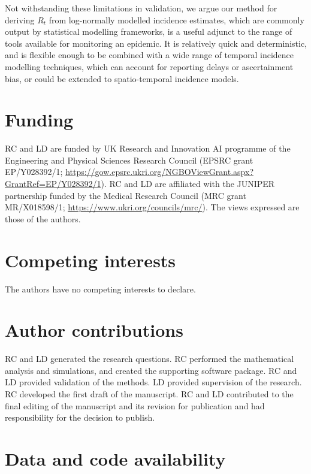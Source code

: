 \documentclass[10pt,letterpaper]{article}
\begin{document}
Not withstanding these limitations in validation, we argue our method for deriving $R_t$ from log-normally modelled incidence estimates, which are commonly output by statistical modelling frameworks, is a useful adjunct to the range of tools available for monitoring an epidemic. It is relatively quick and deterministic, and is flexible enough to be combined with a wide range of temporal incidence modelling techniques, which can account for reporting delays or ascertainment bias, or could be extended to spatio-temporal incidence models.

\nolinenumbers



\section*{Funding}

RC and LD are funded by UK Research and Innovation AI programme of the Engineering and Physical Sciences Research Council (EPSRC grant EP/Y028392/1;  \url{https://gow.epsrc.ukri.org/NGBOViewGrant.aspx?GrantRef=EP/Y028392/1}). RC and LD are affiliated with the JUNIPER partnership funded by the Medical Research Council (MRC grant MR/X018598/1; \url{https://www.ukri.org/councils/mrc/}). The views expressed are those of the authors.

\section*{Competing interests}

The authors have no competing interests to declare.

\section*{Author contributions}

RC and LD generated the research questions. RC performed the mathematical analysis and simulations, and created the supporting software package. RC and LD provided validation of the methods. LD provided supervision of the research. RC developed the first draft of the manuscript. RC and LD contributed to the final editing of the manuscript and its revision for publication and had responsibility for the decision to publish.

\section*{Data and code availability}
\end{document}
